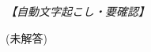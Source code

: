 \documentclass[../../main.tex]{subfiles}
\begin{document}
\begin{oframed}
  
\end{oframed}

\begin{flushright}
  \footnotesize\textit{【自動文字起こし・要確認】}
\end{flushright}

(未解答)
\end{document}
